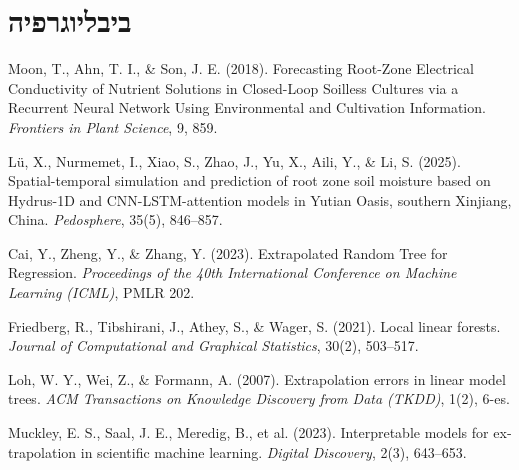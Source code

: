 \section{ביבליוגרפיה}

\newcommand{\refentry}[1]{\par\noindent #1\par\smallskip}

\begingroup
\setmainlanguage{english}
\setlength{\parindent}{0pt}
\begin{LTR}

\refentry{Moon, T., Ahn, T. I., \& Son, J. E. (2018). Forecasting Root-Zone Electrical Conductivity of Nutrient Solutions in Closed-Loop Soilless Cultures via a Recurrent Neural Network Using Environmental and Cultivation Information. \textit{Frontiers in Plant Science}, 9, 859.}

\refentry{Lü, X., Nurmemet, I., Xiao, S., Zhao, J., Yu, X., Aili, Y., \& Li, S. (2025). Spatial-temporal simulation and prediction of root zone soil moisture based on Hydrus-1D and CNN-LSTM-attention models in Yutian Oasis, southern Xinjiang, China. \textit{Pedosphere}, 35(5), 846--857.}

\refentry{Cai, Y., Zheng, Y., \& Zhang, Y. (2023). Extrapolated Random Tree for Regression. \textit{Proceedings of the 40th International Conference on Machine Learning (ICML)}, PMLR 202.}

\refentry{Friedberg, R., Tibshirani, J., Athey, S., \& Wager, S. (2021). Local linear forests. \textit{Journal of Computational and Graphical Statistics}, 30(2), 503--517.}

\refentry{Loh, W. Y., Wei, Z., \& Formann, A. (2007). Extrapolation errors in linear model trees. \textit{ACM Transactions on Knowledge Discovery from Data (TKDD)}, 1(2), 6-es.}

\refentry{Muckley, E. S., Saal, J. E., Meredig, B., et al. (2023). Interpretable models for extrapolation in scientific machine learning. \textit{Digital Discovery}, 2(3), 643--653.}

\end{LTR}
\endgroup
